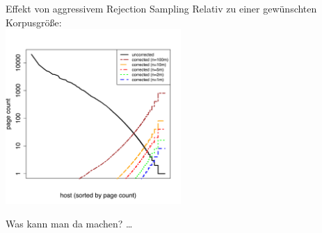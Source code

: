 \begin{frame}
  {Effekt von aggressivem Rejection Sampling}
  Relativ zu einer \alert{gewünschten} Korpusgröße:\\
  \vspace{0.5cm}
  \centering
  \includegraphics[width=0.5\textwidth]{graphics/corrected}\\
  \vspace{0.1cm}
  \pause
  \raggedright
  Was kann man da machen? \ldots
\end{frame}
